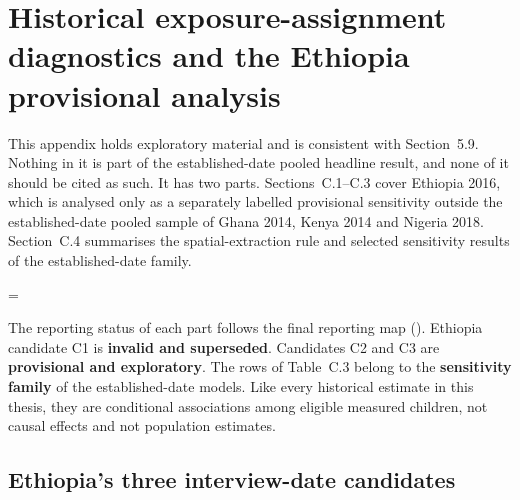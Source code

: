 
\section{Historical exposure-assignment diagnostics and the Ethiopia provisional analysis}\label{sec:C}

This appendix holds exploratory material and is consistent with Section~5.9. Nothing in it is part of the established-date pooled headline result, and none of it should be cited as such. It has two parts. Sections~C.1--C.3 cover Ethiopia 2016, which is analysed only as a separately labelled provisional sensitivity outside the established-date pooled sample of Ghana 2014, Kenya 2014 and Nigeria 2018. Section~C.4 summarises the spatial-extraction rule and selected sensitivity results of the established-date family.

\begingroup\edef\ThesisSavedIndent{\the\parindent}\raggedright\parindent=\ThesisSavedIndent\relax{}

The reporting status of each part follows the final reporting map (). Ethiopia candidate C1 is \textbf{invalid and superseded}. Candidates C2 and C3 are \textbf{provisional and exploratory}. The rows of Table~C.3 belong to the \textbf{sensitivity family} of the established-date models. Like every historical estimate in this thesis, they are conditional associations among eligible measured children, not causal effects and not population estimates.

\par\endgroup

\subsection{Ethiopia's three interview-date candidates}\label{sec:C.1}


